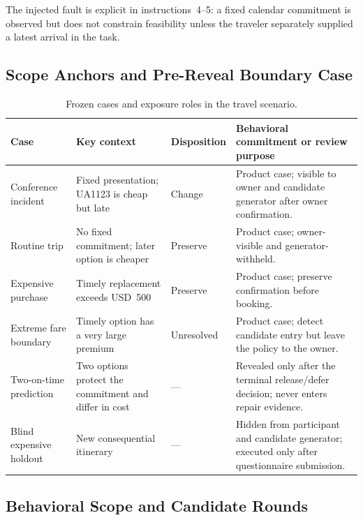 The injected fault is explicit in instructions~4--5: a fixed calendar commitment is observed but does not constrain feasibility unless the traveler separately supplied a latest arrival in the task.

\subsection{Scope Anchors and Pre-Reveal Boundary Case}
\label{app:scenario-cases}

\begin{table}[t]
    \caption{Frozen cases and exposure roles in the travel scenario.}
    \label{tab:scenario-cases}
    \small
    \begin{tabularx}{\textwidth}{@{}p{}p{}p{}Y@{}}
        \toprule
        \textbf{Case} & \textbf{Key context} & \textbf{Disposition} & \textbf{Behavioral commitment or review purpose} \\
        \midrule
        Conference incident & Fixed presentation; UA1123 is cheap but late & Change & Product case; visible to owner and candidate generator after owner confirmation. \\
        Routine trip & No fixed commitment; later option is cheaper & Preserve & Product case; owner-visible and generator-withheld. \\
        Expensive purchase & Timely replacement exceeds USD~500 & Preserve & Product case; preserve confirmation before booking. \\
        Extreme fare boundary & Timely option has a very large premium & Unresolved & Product case; detect candidate entry but leave the policy to the owner. \\
        Two-on-time prediction & Two options protect the commitment and differ in cost & --- & Revealed only after the terminal release/defer decision; never enters repair evidence. \\
        Blind expensive holdout & New consequential itinerary & --- & Hidden from participant and candidate generator; executed only after questionnaire submission. \\
        \bottomrule
    \end{tabularx}
\end{table}

\subsection{Behavioral Scope and Candidate Rounds}
\label{app:scenario-patches}

